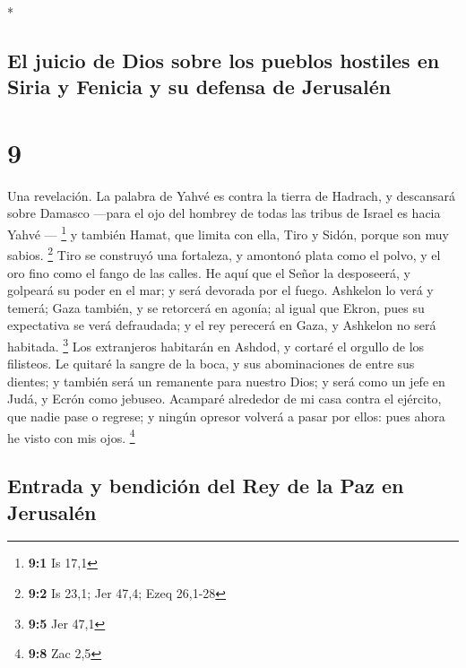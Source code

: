 \begin{paracol}{2}
\begin{otherlanguage}{english}
\end{otherlanguage}

\switchcolumn[0]*

\hypertarget{el-juicio-de-dios-sobre-los-pueblos-hostiles-en-siria-y-fenicia-y-su-defensa-de-jerusaluxe9n}{%
\subsection{El juicio de Dios sobre los pueblos hostiles en Siria y
Fenicia y su defensa de
Jerusalén}\label{el-juicio-de-dios-sobre-los-pueblos-hostiles-en-siria-y-fenicia-y-su-defensa-de-jerusaluxe9n}}

\hypertarget{section-16}{%
\section{9}\label{section-16}}

 Una revelación. La palabra de Yahvé es contra la tierra
de Hadrach, y descansará sobre Damasco ---para el ojo del hombrey de
todas las tribus de Israel es hacia Yahvé --- \footnote{\textbf{9:1} Is
  17,1}  y también Hamat, que limita con ella, Tiro y
Sidón, porque son muy sabios. \footnote{\textbf{9:2} Is 23,1; Jer 47,4;
  Ezeq 26,1-28}  Tiro se construyó una fortaleza, y
amontonó plata como el polvo, y el oro fino como el fango de las calles.
 He aquí que el Señor la desposeerá, y golpeará su poder
en el mar; y será devorada por el fuego.  Ashkelon lo verá
y temerá; Gaza también, y se retorcerá en agonía; al igual que Ekron,
pues su expectativa se verá defraudada; y el rey perecerá en Gaza, y
Ashkelon no será habitada. \footnote{\textbf{9:5} Jer 47,1}
 Los extranjeros habitarán en Ashdod, y cortaré el orgullo
de los filisteos.  Le quitaré la sangre de la boca, y sus
abominaciones de entre sus dientes; y también será un remanente para
nuestro Dios; y será como un jefe en Judá, y Ecrón como jebuseo.
 Acamparé alrededor de mi casa contra el ejército, que
nadie pase o regrese; y ningún opresor volverá a pasar por ellos: pues
ahora he visto con mis ojos. \footnote{\textbf{9:8} Zac 2,5}

\hypertarget{entrada-y-bendiciuxf3n-del-rey-de-la-paz-en-jerusaluxe9n}{%
\subsection{Entrada y bendición del Rey de la Paz en
Jerusalén}\label{entrada-y-bendiciuxf3n-del-rey-de-la-paz-en-jerusaluxe9n}}


\end{paracol}
